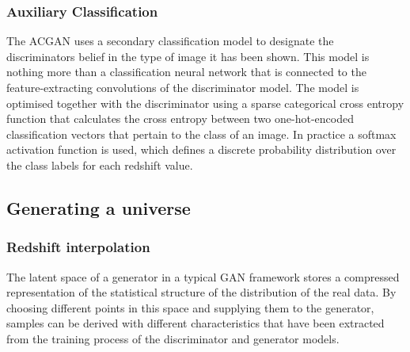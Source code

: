 \documentclass[twocolumn]{article}
\numberwithin{equation}{section}
\begin{document}

\subsubsection{Auxiliary Classification}
The ACGAN uses a secondary classification model to designate the discriminators belief in the type of image it has been 
shown. This model is nothing more than a classification neural network that is connected to the feature-extracting 
convolutions of the discriminator model. The model is optimised together with the discriminator using a sparse categorical
cross entropy function that calculates the cross entropy between two one-hot-encoded classification vectors that pertain 
to the class of an image. In practice a softmax activation function is used, which defines a discrete probability 
distribution over the class labels for each redshift value. 


\subsection{Generating a universe}


\subsubsection{Redshift interpolation}
The latent space of a generator in a typical GAN framework stores a compressed representation of the statistical structure
of the distribution of the real data. By choosing different points in this space and supplying them to the generator, 
samples can be derived with different characteristics that have been extracted from the training process of the discriminator
and generator models.
\end{document}
